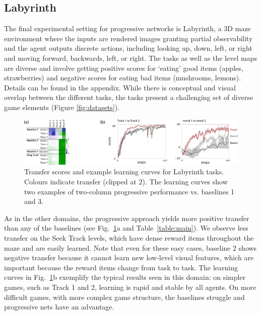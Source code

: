 \subsection{Labyrinth}

The final experimental setting for progressive networks is Labyrinth,
a 3D maze environment where the inputs are rendered images granting partial
observability and the agent outputs discrete actions,
including looking up, down, left, or right and moving forward,
backwards, left, or right. The tasks as well as the level maps are
diverse and involve getting positive scores for `eating' good items
(apples, strawberries) and negative scores for eating bad items
(mushrooms, lemons). Details can be found in the appendix. While there is conceptual and
visual overlap between the different tasks, the tasks present a
challenging set of diverse game elements (Figure
\ref{fig:datasets}).

\begin{figure}[h]
  \centering
    \includegraphics[width=\textwidth]{figures/transfer_lab.pdf}
    \caption{Transfer scores and example learning curves for Labyrinth tasks. Colours indicate transfer (clipped at 2). The learning curves show two examples of two-column progressive performance vs. baselines 1 and 3.}
    \label{fig:lab}
\end{figure}

As in the other domains, the progressive approach yields more positive transfer than any of the baselines (see Fig.~\ref{fig:lab}a and Table~\ref{table:main}). We observe less transfer on the Seek Track levels, which have dense reward items throughout the maze and are easily learned. Note that even for these easy cases, baseline 2 shows negative transfer because it cannot learn new low-level visual features, which are important because the reward items change from task to task. The learning curves in Fig.~\ref{fig:lab}b exemplify the typical results seen in this domain: on simpler games, such as Track 1 and 2, learning is rapid and stable by all agents. On more difficult games, with more complex game structure, the baselines struggle and progressive nets have an advantage.
